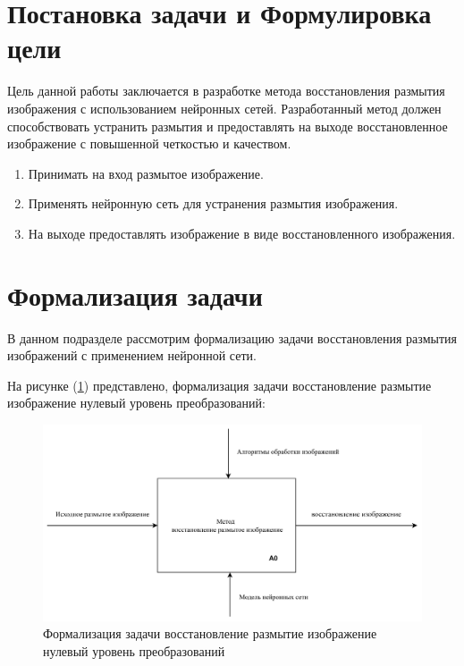 \section{Постановка задачи и Формулировка цели}

Цель данной работы заключается в разработке метода восстановления размытия изображения с использованием нейронных сетей. Разработанный метод должен способствовать устранить размытия и предоставлять на выходе восстановленное изображение с повышенной четкостью и качеством.
\begin{enumerate}
	\item Принимать на вход размытое изображение.
	\item Применять нейронную сеть для устранения размытия изображения.
	\item На выходе предоставлять изображение в виде восстановленного изображения.
\end{enumerate}

\section{Формализация задачи}

В данном подразделе рассмотрим формализацию задачи восстановления размытия изображений с применением нейронной сети.

На рисунке (\ref{fig:method-desc-a0}) представлено, формализация задачи восстановление размытие изображение нулевый уровень преобразований: 
\begin{figure}[H]
	\centering
	\includegraphics[width=1\linewidth]{assets/idef0-A0.png}
	\caption{Формализация задачи восстановление размытие изображение нулевый уровень преобразований}
	\label{fig:method-desc-a0}
\end{figure}


